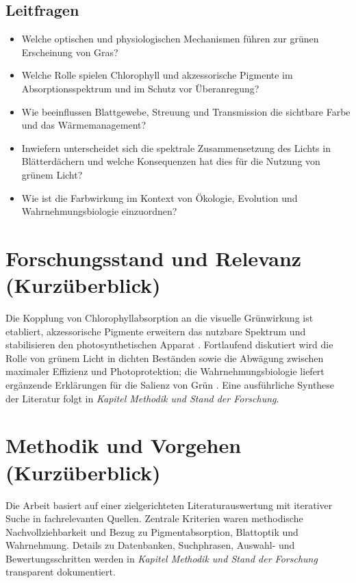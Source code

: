 \subsection{Leitfragen}
\begin{itemize}
  \item Welche optischen und physiologischen Mechanismen führen zur grünen Erscheinung von Gras?
  \item Welche Rolle spielen Chlorophyll und akzessorische Pigmente im Absorptionsspektrum und im Schutz vor Überanregung?
  \item Wie beeinflussen Blattgewebe, Streuung und Transmission die sichtbare Farbe und das Wärmemanagement?
  \item Inwiefern unterscheidet sich die spektrale Zusammensetzung des Lichts in Blätterdächern und welche Konsequenzen hat dies für die Nutzung von grünem Licht?
  \item Wie ist die Farbwirkung im Kontext von Ökologie, Evolution und Wahrnehmungsbiologie einzuordnen?
\end{itemize}

\section{Forschungsstand und Relevanz (Kurzüberblick)}
Die Kopplung von Chlorophyllabsorption an die visuelle Grünwirkung ist etabliert, akzessorische Pigmente erweitern das nutzbare Spektrum und stabilisieren den photosynthetischen Apparat \parencite{meyer2018photosynthese, schmidt2015chlorophyll}. Fortlaufend diskutiert wird die Rolle von grünem Licht in dichten Beständen sowie die Abwägung zwischen maximaler Effizienz und Photoprotektion; die Wahrnehmungsbiologie liefert ergänzende Erklärungen für die Salienz von Grün \parencite{renoult2017evolution}. Eine ausführliche Synthese der Literatur folgt in \emph{Kapitel Methodik und Stand der Forschung}.

\section{Methodik und Vorgehen (Kurzüberblick)}
Die Arbeit basiert auf einer zielgerichteten Literaturauswertung mit iterativer Suche in fachrelevanten Quellen. Zentrale Kriterien waren methodische Nachvollziehbarkeit und Bezug zu Pigmentabsorption, Blattoptik und Wahrnehmung. Details zu Datenbanken, Suchphrasen, Auswahl- und Bewertungsschritten werden in \emph{Kapitel Methodik und Stand der Forschung} transparent dokumentiert.

